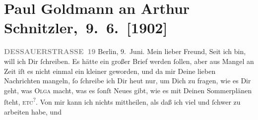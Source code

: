 

         
         \renewcommand{\erwaehntePersonen}{Personen: Paul Goldmann, Olga Schnitzler}
         \renewcommand{\erwaehnteOrte}{Orte: Berlin, Dessauer Straße, Wien}
         \renewcommand{\erwaehnteWerke}{}
               \section[ Paul Goldmann an Arthur Schnitzler, 9. 6. {[}1902{]}]{ Paul Goldmann an Arthur Schnitzler, 9. 6. {[}1902{]}}\nopagebreak{}\rehead{ }\begin{ledgroupsized}[t]{13cm}\normalsize\beginnumbering{} \toendnotes[C]{\smallbreak\pagebreak[2]} 
\toendnotes[C]{\smallbreak}\pstart
           \noindent{}\raggedleft{}{\pb}\textcolor{gray}{\textbf{DESSAUERSTRASSE 19}}\pend
           \pstart
           Berlin, 9. Juni.\pend
           \pstart\center{}Mein lieber Freund,\pend\pstart
           Seit ich \label{K_L03210-1v}\label{K_L03210-1h} bin, will ich Dir ſchreiben.
               Es hätte ein großer Brief werden ſollen, aber aus Mangel an Zeit iſt es nicht einmal
               ein kleiner geworden, und da mir Deine lieben Nachrichten mangeln, ſo ſchreibe ich
               Dir heut nur, um Dich zu fragen, wie es Dir geht, was
                  \textsc{Olga} macht, was {\pb}es ſonſt Neues gibt, wie es mit
               Deinen Sommerplänen ſteht, \textsc{etc}\substVorne{}\textsuperscript{?}\substDazwischen{}.\substHinten{}\pend
           \pstart
           Von mir kann ich nichts mittheilen, als daß ich viel und ſchwer zu arbeiten habe, und

\end{ledgroupsized}

